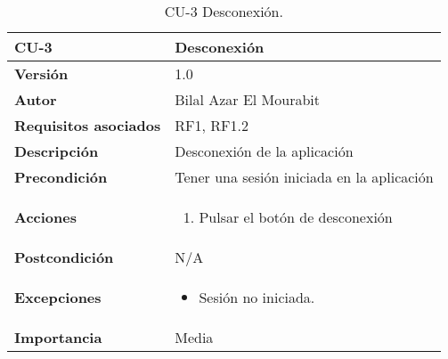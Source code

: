 \begin{table}[H]
	\centering
	\begin{tabularx}{\linewidth}{ p{} p{} }
		\toprule
		\textbf{CU-3}    & \textbf{Desconexión}\\
		\toprule
		\textbf{Versión}              & 1.0    \\
		\textbf{Autor}                & Bilal Azar El Mourabit \\
		\textbf{Requisitos asociados} & RF1, RF1.2 \\
		\textbf{Descripción}          & Desconexión de la aplicación \\
    		\textbf{Precondición}         & Tener una sesión iniciada en la aplicación  \\
		\textbf{Acciones}             & 
		\begin{enumerate}
			\def\labelenumi{\arabic{enumi}.}
			\tightlist
			\item Pulsar el botón de desconexión
		\end{enumerate}\\
		\textbf{Postcondición}        & N/A \\
		\textbf{Excepciones}          & \begin{itemize}
		    \item Sesión no iniciada.
		\end{itemize} \\
		\textbf{Importancia}          & Media \\
		\bottomrule
	\end{tabularx}
	\caption{CU-3 Desconexión.}
\end{table}

